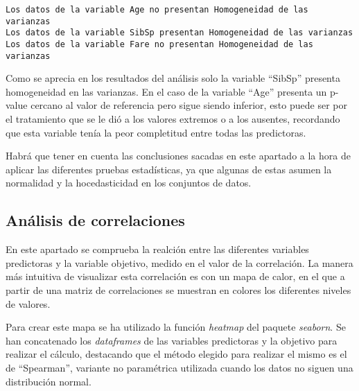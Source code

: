 \documentclass[11pt]{article}
\begin{document}
    \begin{Verbatim}[commandchars=\\\{\}]
Los datos de la variable Age no presentan Homogeneidad de las varianzas
Los datos de la variable SibSp presentan Homogeneidad de las varianzas
Los datos de la variable Fare no presentan Homogeneidad de las varianzas
    \end{Verbatim}

    Como se aprecia en los resultados del análisis solo la variable
``SibSp'' presenta homogeneidad en las varianzas. En el caso de la
variable ``Age'' presenta un p-value cercano al valor de referencia pero
sigue siendo inferior, esto puede ser por el tratamiento que se le dió a
los valores extremos o a los ausentes, recordando que esta variable
tenía la peor completitud entre todas las predictoras.

    Habrá que tener en cuenta las conclusiones sacadas en este apartado a la
hora de aplicar las diferentes pruebas estadísticas, ya que algunas de
estas asumen la normalidad y la hocedasticidad en los conjuntos de
datos.

    \hypertarget{anuxe1lisis-de-correlaciones}{%
\subsection{Análisis de
correlaciones}\label{anuxe1lisis-de-correlaciones}}

    En este apartado se comprueba la realción entre las diferentes variables
predictoras y la variable objetivo, medido en el valor de la
correlación. La manera más intuitiva de visualizar esta correlación es
con un mapa de calor, en el que a partir de una matriz de correlaciones
se muestran en colores los diferentes niveles de valores.

Para crear este mapa se ha utilizado la función \emph{heatmap} del
paquete \emph{seaborn}. Se han concatenado los \emph{dataframes} de las
variables predictoras y la objetivo para realizar el cálculo, destacando
que el método elegido para realizar el mismo es el de ``Spearman'',
variante no paramétrica utilizada cuando los datos no siguen una
distribución normal.
\end{document}
